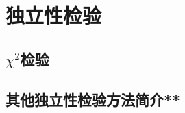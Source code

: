 
\section{独立性检验}
\subsection{\texorpdfstring{$\chi^2$}a检验}









\clearpage
\subsection{其他独立性检验方法简介**}
\clearpage

